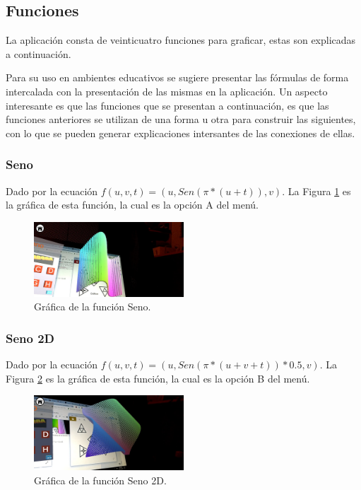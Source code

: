 \FloatBarrier

\subsection{Funciones} 
La aplicación consta de veinticuatro funciones para graficar, estas son explicadas a continuación. 

Para su uso en ambientes educativos se sugiere presentar las fórmulas de forma intercalada con la presentación de las mismas en la aplicación. Un aspecto interesante es que las funciones que se presentan a continuación, es que las funciones anteriores se utilizan de una forma u otra para construir las siguientes, con lo que se pueden generar explicaciones intersantes de las conexiones de ellas. 

\subsubsection{Seno}
Dado por la ecuación $f(u,v,t)=(u,Sen(\pi * (u + t)),v)$. La Figura \ref{fig:graf_seno} es la gráfica de esta función, la cual es la opción A del menú.

\begin{figure}[hbt!]
\centering
\includegraphics[width=0.5\textwidth]{figuras/graficas/seno.png}
\caption{\label{fig:graf_seno}Gráfica de la función Seno.}
\end{figure}
\FloatBarrier

\subsubsection{Seno 2D}
Dado por la ecuación $f(u,v,t)=(u,Sen(\pi * (u + v+ t))*0.5,v)$. La Figura \ref{fig:graf_seno2d} es la gráfica de esta función, la cual es la opción B del menú.

\begin{figure}[hbt!]
\centering
\includegraphics[width=0.5\textwidth]{figuras/graficas/seno2d.png}
\caption{\label{fig:graf_seno2d}Gráfica de la función Seno 2D.}
\end{figure}
\FloatBarrier

